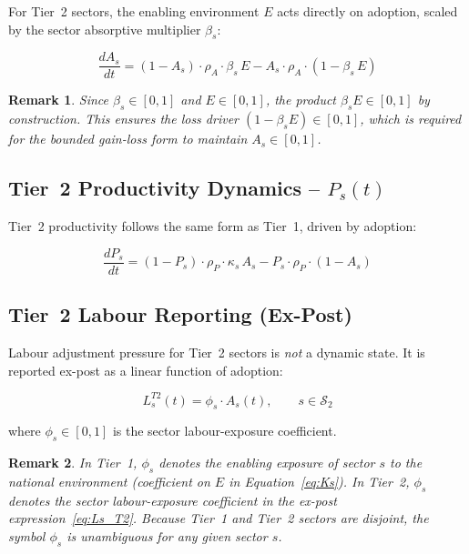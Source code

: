 \documentclass[11pt,a4paper]{article}
\newtheorem{remark}{Remark}
\begin{document}
For Tier~2 sectors, the enabling environment $E$ acts directly on adoption, scaled by the sector absorptive multiplier $\beta_s$:

\begin{equation}
\boxed{
\frac{dA_s}{dt}
= (1 - A_s)\cdot\rho_A\cdot\beta_s\, E
- A_s\cdot\rho_A\cdot(1 - \beta_s\, E)
}
\label{eq:As_T2}
\end{equation}

\begin{remark}
Since $\beta_s \in [0,1]$ and $E \in [0,1]$, the product $\beta_s E \in [0,1]$ by construction. This ensures the loss driver $(1 - \beta_s E) \in [0,1]$, which is required for the bounded gain-loss form to maintain $A_s \in [0,1]$.
\end{remark}

\subsection{Tier~2 Productivity Dynamics -- \texorpdfstring{$P_s(t)$}{Ps(t)}}

Tier~2 productivity follows the same form as Tier~1, driven by adoption:

\begin{equation}
\boxed{
\frac{dP_s}{dt}
= (1 - P_s)\cdot\rho_P\cdot\kappa_s\, A_s
- P_s\cdot\rho_P\cdot(1 - A_s)
}
\label{eq:Ps_T2}
\end{equation}

\subsection{Tier~2 Labour Reporting (Ex-Post)}

Labour adjustment pressure for Tier~2 sectors is \emph{not} a dynamic state. It is reported ex-post as a linear function of adoption:

\begin{equation}
L_s^{T2}(t) = \phi_s\cdot A_s(t), \qquad s \in \mathcal{S}_2
\label{eq:Ls_T2}
\end{equation}

where $\phi_s \in [0,1]$ is the sector labour-exposure coefficient.

\begin{remark}
In Tier~1, $\phi_s$ denotes the enabling exposure of sector $s$ to the national environment (coefficient on $E$ in Equation~\eqref{eq:Ks}). In Tier~2, $\phi_s$ denotes the sector labour-exposure coefficient in the ex-post expression~\eqref{eq:Ls_T2}. Because Tier~1 and Tier~2 sectors are disjoint, the symbol $\phi_s$ is unambiguous for any given sector $s$.
\end{remark}
\end{document}
